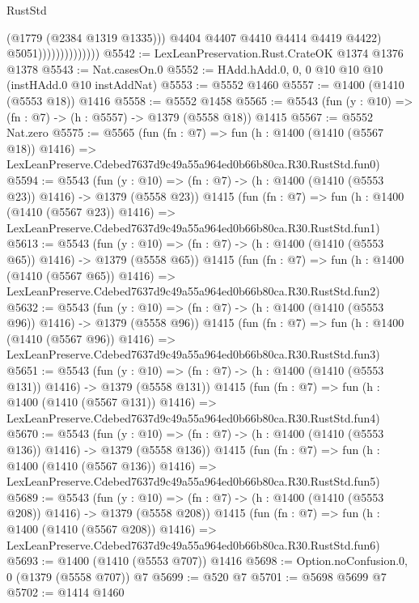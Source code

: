 \begin{lexlean}{RustStd}
\begin{coremodule}
                                    (@1779 (@2384 @1319 @1335)))
                                  @4404
                                  @4407
                                  @4410
                                  @4414
                                  @4419
                                  @4422)
                                @5051))))))))))))))
@5542 := LexLeanPreservation.Rust.CrateOK @1374 @1376 @1378
@5543 := Nat.casesOn.{0}
@5552 := HAdd.hAdd.{0, 0, 0} @10 @10 @10 (instHAdd.{0} @10 instAddNat)
@5553 := @5552 @1460
@5557 := @1400 (@1410 (@5553 @18)) @1416
@5558 := @5552 @1458
@5565 := @5543 (fun (y : @10) => (fn : @7) -> (h : @5557) -> @1379 (@5558 @18)) @1415
@5567 := @5552 Nat.zero
@5575 := @5565
    (fun (fn : @7) =>
    fun (h : @1400 (@1410 (@5567 @18)) @1416) =>
    LexLeanPreserve.Cdebed7637d9c49a55a964ed0b66b80ca.R30.RustStd.fun0)
@5594 := @5543
    (fun (y : @10) => (fn : @7) -> (h : @1400 (@1410 (@5553 @23)) @1416) -> @1379 (@5558 @23))
    @1415
    (fun (fn : @7) =>
    fun (h : @1400 (@1410 (@5567 @23)) @1416) =>
    LexLeanPreserve.Cdebed7637d9c49a55a964ed0b66b80ca.R30.RustStd.fun1)
@5613 := @5543
    (fun (y : @10) => (fn : @7) -> (h : @1400 (@1410 (@5553 @65)) @1416) -> @1379 (@5558 @65))
    @1415
    (fun (fn : @7) =>
    fun (h : @1400 (@1410 (@5567 @65)) @1416) =>
    LexLeanPreserve.Cdebed7637d9c49a55a964ed0b66b80ca.R30.RustStd.fun2)
@5632 := @5543
    (fun (y : @10) => (fn : @7) -> (h : @1400 (@1410 (@5553 @96)) @1416) -> @1379 (@5558 @96))
    @1415
    (fun (fn : @7) =>
    fun (h : @1400 (@1410 (@5567 @96)) @1416) =>
    LexLeanPreserve.Cdebed7637d9c49a55a964ed0b66b80ca.R30.RustStd.fun3)
@5651 := @5543
    (fun (y : @10) => (fn : @7) -> (h : @1400 (@1410 (@5553 @131)) @1416) -> @1379 (@5558 @131))
    @1415
    (fun (fn : @7) =>
    fun (h : @1400 (@1410 (@5567 @131)) @1416) =>
    LexLeanPreserve.Cdebed7637d9c49a55a964ed0b66b80ca.R30.RustStd.fun4)
@5670 := @5543
    (fun (y : @10) => (fn : @7) -> (h : @1400 (@1410 (@5553 @136)) @1416) -> @1379 (@5558 @136))
    @1415
    (fun (fn : @7) =>
    fun (h : @1400 (@1410 (@5567 @136)) @1416) =>
    LexLeanPreserve.Cdebed7637d9c49a55a964ed0b66b80ca.R30.RustStd.fun5)
@5689 := @5543
    (fun (y : @10) => (fn : @7) -> (h : @1400 (@1410 (@5553 @208)) @1416) -> @1379 (@5558 @208))
    @1415
    (fun (fn : @7) =>
    fun (h : @1400 (@1410 (@5567 @208)) @1416) =>
    LexLeanPreserve.Cdebed7637d9c49a55a964ed0b66b80ca.R30.RustStd.fun6)
@5693 := @1400 (@1410 (@5553 @707)) @1416
@5698 := Option.noConfusion.{0, 0} (@1379 (@5558 @707)) @7
@5699 := @520 @7
@5701 := @5698 @5699 @7
@5702 := @1414 @1460

\end{coremodule}
\end{lexlean}
